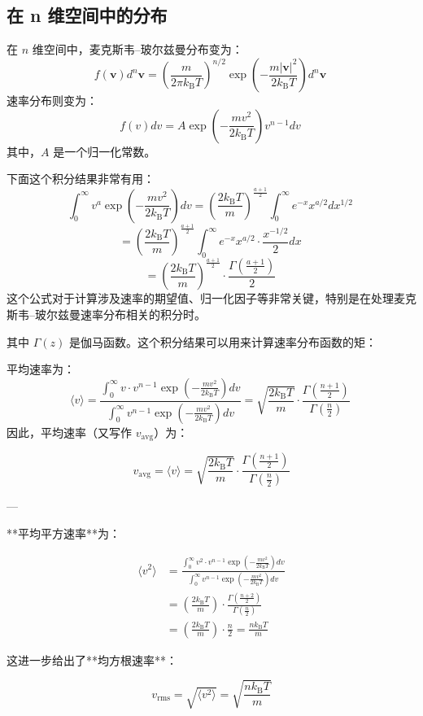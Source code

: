 \subsection{在 n 维空间中的分布}
在 $n$ 维空间中，麦克斯韦–玻尔兹曼分布变为：
$$
f(\mathbf{v}) d^n\mathbf{v} = \left( \frac{m}{2\pi k_{\text{B}} T} \right)^{n/2} \exp\left( -\frac{m |\mathbf{v}|^2}{2k_{\text{B}} T} \right) d^n\mathbf{v}~
$$
速率分布则变为：
$$
f(v) dv = A \exp\left( -\frac{m v^2}{2k_{\text{B}} T} \right) v^{n-1} dv~
$$
其中，$A$ 是一个归一化常数。

下面这个积分结果非常有用：
$$
\int_0^\infty v^a \exp\left( -\frac{m v^2}{2k_{\text{B}} T} \right) dv = \left( \frac{2k_{\text{B}} T}{m} \right)^{\frac{a+1}{2}} \int_0^\infty e^{-x} x^{a/2} dx^{1/2}~
$$
$$
= \left( \frac{2k_{\text{B}} T}{m} \right)^{\frac{a+1}{2}} \int_0^\infty e^{-x} x^{a/2} \cdot \frac{x^{-1/2}}{2} dx~
$$
$$
= \left( \frac{2k_{\text{B}} T}{m} \right)^{\frac{a+1}{2}} \cdot \frac{\Gamma\left( \frac{a+1}{2} \right)}{2}~
$$
这个公式对于计算涉及速率的期望值、归一化因子等非常关键，特别是在处理麦克斯韦–玻尔兹曼速率分布相关的积分时。

其中 $\Gamma(z)$ 是伽马函数。这个积分结果可以用来计算速率分布函数的矩：

平均速率为：
$$
\langle v \rangle = \frac{ \int_0^\infty v \cdot v^{n-1} \exp\left( -\frac{m v^2}{2k_{\text{B}}T} \right) dv }{ \int_0^\infty v^{n-1} \exp\left( -\frac{m v^2}{2k_{\text{B}}T} \right) dv } = \sqrt{ \frac{2k_{\text{B}}T}{m} } \cdot \frac{ \Gamma\left( \frac{n+1}{2} \right) }{ \Gamma\left( \frac{n}{2} \right) }~
$$
因此，平均速率（又写作 $v_{\text{avg}}$）\*\*为：

$$
v_{\text{avg}} = \langle v \rangle = \sqrt{ \frac{2k_{\text{B}}T}{m} } \cdot \frac{ \Gamma\left( \frac{n+1}{2} \right) }{ \Gamma\left( \frac{n}{2} \right) }
$$

---

**平均平方速率**为：

$$
\begin{aligned}
\langle v^2 \rangle &= \frac{ \int_0^\infty v^2 \cdot v^{n-1} \exp\left( -\frac{m v^2}{2k_{\text{B}}T} \right) dv }{ \int_0^\infty v^{n-1} \exp\left( -\frac{m v^2}{2k_{\text{B}}T} \right) dv } \\
&= \left( \frac{2k_{\text{B}}T}{m} \right) \cdot \frac{ \Gamma\left( \frac{n+2}{2} \right) }{ \Gamma\left( \frac{n}{2} \right) } \\
&= \left( \frac{2k_{\text{B}}T}{m} \right) \cdot \frac{n}{2} = \frac{n k_{\text{B}} T}{m}
\end{aligned}
$$

这进一步给出了**均方根速率**：

$$
v_{\text{rms}} = \sqrt{ \langle v^2 \rangle } = \sqrt{ \frac{n k_{\text{B}} T}{m} }
$$
